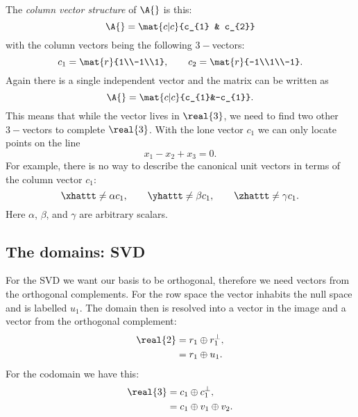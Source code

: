 The \textit{column vector structure} of $\A{}$ is this:
\begin{equation}
  \A{}=\mat{c|c}{c_{1} & c_{2}}
\end{equation}
with the column vectors being the following $3-$vectors:
\begin{equation}
  c_{1}=\mat{r}{1\\-1\\1}, \qquad c_{2}=\mat{r}{-1\\1\\-1}.
\end{equation}
Again there is a single independent vector and the matrix can be written as
\begin{equation}
  \A{}=\mat{c|c}{c_{1}&-c_{1}}.
\end{equation}
This means that while the vector lives in $\real{3}$, we need to find two other $3-$vectors to complete  $\real{3}$. With the lone vector $c_{1}$ we can only locate points on the line 
\begin{equation}
x_{1}-x_{2}+x_{3}=0.
\end{equation}
For example, there is no way to describe the canonical unit vectors in terms of the column vector $c_{1}$:
\begin{equation}
  \xhattt \ne \alpha c_{1}, \qquad \yhattt \ne \beta c_{1}, \qquad \zhattt \ne \gamma c_{1}.
\end{equation}
Here $\alpha$, $\beta$, and $\gamma$ are arbitrary scalars.

\subsection{The domains: SVD}
For the SVD we want our basis to be orthogonal, therefore we need vectors from the orthogonal complements. For the row space the vector inhabits the null space and is labelled $u_{1}$. The domain then is resolved into a vector in the image and a vector from the orthogonal complement:
\begin{equation}
  \begin{split}
    \real{2}&=r_{1}\oplus r_{1}^{\perp},\\
      & =r_{1}\oplus u_{1}.
  \end{split}
\end{equation}
For the codomain we have this:
\begin{equation}
  \begin{split}
    \real{3}&=c_{1}\oplus c_{1}^{\perp},\\
      & =c_{1}\oplus v_{1} \oplus v_{2}.
  \end{split}
\end{equation}

